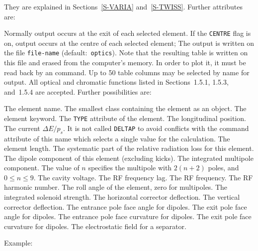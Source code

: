 They are explained in Sections~\ref{S-VARIA} and~\ref{S-TWISS}.
Further attributes are:
\begin{mylist}
Normally output occurs at the exit of each selected element.
If the {\tt CENTRE} flag is on,
output occurs at the centre of each selected element;
The output is written on the file {\tt file-name}
(default:~{\tt optics}).
Note that the resulting table is written on this file and erased from
the computer's memory.
In order to plot it, it must be read back by an 
command.
Up to 50 table columns may be selected by name for output.
All optical and chromatic functions listed
in Sections~1.5.1, 1.5.3, and~1.5.4 are accepted.
Further possibilities are:
\begin{mylist}
The element name.
The smallest class containing the element as an object.
The element keyword.
The {\tt TYPE} attribute of the element.
The longitudinal position.
The current \(\Delta E / p_s\).
It is not called {\tt DELTAP} to avoid conflicts with the command
attribute of this name which selects a single value for the calculation.
The element length.
The systematic part of the relative radiation loss for this element.
The dipole component of this element (excluding kicks).
The integrated multipole component. The value of \(n\) specifies the
multipole with \(2 (n + 2)\) poles, and \(0 \le n \le 9\).
The cavity voltage.
The RF frequency lag.
The RF frequency.
The RF harmonic number.
The roll angle of the element, zero for multipoles.
The integrated solenoid strength.
The horizontal corrector deflection.
The vertical corrector deflection.
The entrance pole face angle for dipoles.
The exit pole face angle for dipoles.
The entrance pole face curvature for dipoles.
The exit pole face curvature for dipoles.
The electrostatic field for a separator.
\end{mylist}
\end{mylist}
Example:
